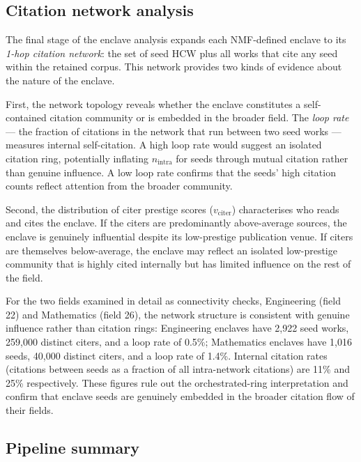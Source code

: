 \subsection{Citation network analysis}

The final stage of the enclave analysis expands each NMF-defined enclave to
its \emph{1-hop citation network}: the set of seed HCW plus all works that
cite any seed within the retained corpus.  This network provides two kinds of
evidence about the nature of the enclave.

First, the network topology reveals whether the enclave constitutes a
self-contained citation community or is embedded in the broader field.  The
\emph{loop rate} — the fraction of citations in the network that run between
two seed works — measures internal self-citation.  A high loop rate would
suggest an isolated citation ring, potentially inflating $n_{\mathrm{intra}}$
for seeds through mutual citation rather than genuine influence.  A low loop
rate confirms that the seeds' high citation counts reflect attention from the
broader community.

Second, the distribution of citer prestige scores ($v_{\mathrm{citer}}$)
characterises who reads and cites the enclave.  If the citers are predominantly
above-average sources, the enclave is genuinely influential despite its
low-prestige publication venue.  If citers are themselves below-average, the
enclave may reflect an isolated low-prestige community that is highly cited
internally but has limited influence on the rest of the field.

For the two fields examined in detail as connectivity checks, Engineering (field
22) and Mathematics (field 26), the network structure is consistent with genuine
influence rather than citation rings: Engineering enclaves have 2,922 seed
works, 259,000 distinct citers, and a loop rate of 0.5\%; Mathematics enclaves
have 1,016 seeds, 40,000 distinct citers, and a loop rate of 1.4\%.  Internal
citation rates (citations between seeds as a fraction of all intra-network
citations) are 11\% and 25\% respectively.  These figures rule out the
orchestrated-ring interpretation and confirm that enclave seeds are genuinely
embedded in the broader citation flow of their fields.

\subsection{Pipeline summary}

